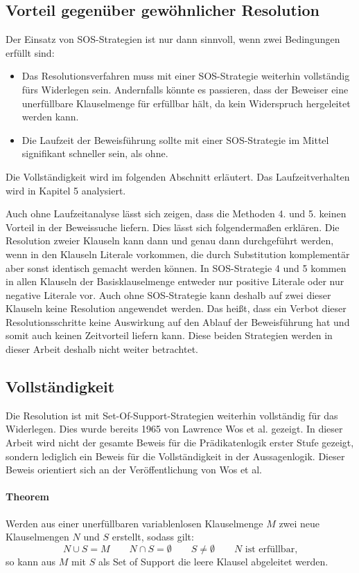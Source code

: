 \subsection{Vorteil gegenüber gewöhnlicher Resolution}
Der Einsatz von SOS-Strategien ist nur dann sinnvoll, wenn zwei Bedingungen erfüllt sind:
\begin{itemize}
	\item Das Resolutionsverfahren muss mit einer SOS-Strategie weiterhin vollständig fürs Widerlegen sein. Andernfalls könnte es passieren, dass der Beweiser eine unerfüllbare Klauselmenge für erfüllbar hält, da kein Widerspruch hergeleitet werden kann.
	\item Die Laufzeit der Beweisführung sollte mit einer SOS-Strategie im Mittel signifikant schneller sein, als ohne.

\end{itemize}
Die Vollständigkeit wird im folgenden Abschnitt erläutert. Das Laufzeitverhalten wird in Kapitel 5 analysiert.

Auch ohne Laufzeitanalyse lässt sich zeigen, dass die Methoden 4. und 5. keinen Vorteil in der Beweissuche liefern. Dies lässt sich folgendermaßen erklären. Die Resolution zweier Klauseln kann dann und genau dann durchgeführt werden, wenn in den Klauseln Literale vorkommen, die durch Substitution komplementär aber sonst identisch gemacht werden können. In SOS-Strategie 4 und 5 kommen in allen Klauseln der Basisklauselmenge entweder nur positive Literale oder nur negative Literale vor. Auch ohne SOS-Strategie kann deshalb auf zwei dieser Klauseln keine Resolution angewendet werden. Das heißt, dass ein Verbot dieser Resolutionsschritte keine Auswirkung auf den Ablauf der Beweisführung hat und somit auch keinen Zeitvorteil liefern kann. Diese beiden Strategien werden in dieser Arbeit deshalb nicht weiter betrachtet.

		\subsection{Vollständigkeit}
		\label{section:vollständigkeitSOS}	
Die Resolution ist mit Set-Of-Support-Strategien weiterhin vollständig für das Widerlegen. Dies wurde bereits 1965 von Lawrence Wos et al. gezeigt. In dieser Arbeit wird nicht der gesamte Beweis für die Prädikatenlogik erster Stufe gezeigt, sondern lediglich ein Beweis für die Vollständigkeit in der Aussagenlogik. Dieser Beweis orientiert sich an der Veröffentlichung von Wos et al. \cite{Wos1965Sos}

\paragraph{Theorem} Werden aus einer unerfüllbaren variablenlosen Klauselmenge $M$ zwei neue Klauselmengen $N$ und $S$ erstellt, sodass gilt: 
$$N \cup S = M \quad\quad N \cap S = \emptyset \quad\quad S \neq \emptyset \quad\quad N \text{ ist erfüllbar,}$$
so kann aus $M$ mit $S$ als Set of Support die leere Klausel abgeleitet werden.

